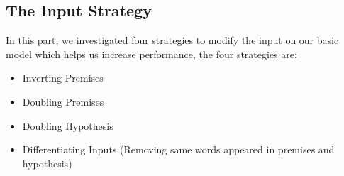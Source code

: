 \documentclass[11pt,letterpaper]{article}
\begin{document}
\subsection{The Input Strategy}
\label{ssec:InputStrategy}

In this part, we investigated four strategies to modify the input on our basic model which helps us increase performance, the four strategies are:
\begin{itemize}
\setlength{\itemsep}{0pt}
\setlength{\parsep}{0pt}
\setlength{\parskip}{0pt}
\item Inverting Premises~\cite{sutskever2014sequence}
\item Doubling Premises~\cite{zaremba2014learning}
\item Doubling Hypothesis
\item Differentiating Inputs (Removing same words appeared in premises and hypothesis)
\end{itemize}
\end{document}
